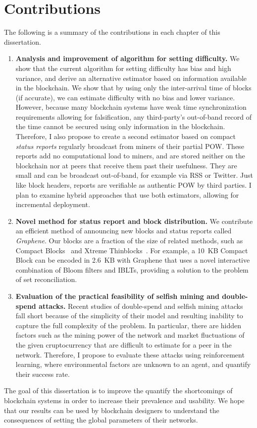 \section*{Contributions}
The following is a summary of the contributions in each chapter of this dissertation. 
\begin{enumerate}
\item \textbf{Analysis and improvement of algorithm for setting difficulty.} We show that the current algorithm for setting difficulty has bias and high variance, and derive an alternative estimator based on information available in the blockchain. We show that by using only the inter-arrival time of blocks (if accurate), we can estimate difficulty with no bias and lower variance. However, because many blockchain systems have weak time synchronization requirements allowing for falsification, any third-party's out-of-band record of the time cannot be secured using only information in the blockchain. Therefore, I also propose to create a second estimator based on compact {\em status reports} regularly broadcast from miners of their partial POW. These reports add no computational load to miners, and are stored neither on the blockchain nor at peers that receive them past their usefulness. They are small and can be broadcast out-of-band, for example via RSS or Twitter. Just like block headers, reports are verifiable as authentic POW by third parties. I plan to examine hybrid approaches that use both estimators, allowing for incremental deployment. 
\item \textbf{Novel method for status report and block distribution.} We contribute an efficient method of announcing new blocks and status reports called \textit{Graphene}. Our blocks are a fraction of the size of related methods, such as Compact Blocks~\cite{Corallo:2016} and Xtreme Thinblocks~\cite{Tschipper:2016}. For example, a 10~KB Compact Block can be encoded in 2.6~KB with Graphene that uses a novel interactive combination of Bloom filters\cite{Bloom:1970} and IBLTs\cite{goodrich:2011}, providing a solution to the problem of set reconciliation. 
\item \textbf{Evaluation of the practical feasibility of selfish mining and double-spend attacks.} Recent studies of double-spend and selfish mining attacks fall short because of the simplicity of their model and resulting inability to capture the full complexity of the problem. In particular, there are hidden factors such as the mining power of the network and market fluctuations of the given cruptocurrency that are difficult to estimate for a peer in the network. Therefore, I propose to evaluate these attacks using reinforcement learning, where environmental factors are unknown to an agent, and quantify their success rate. 
\end{enumerate}
The goal of this dissertation is to improve the quantify the shortcomings of blockchain systems in order to increase their prevalence and usability. We hope that our results can be used by blockchain designers to understand the consequences of setting the global parameters of their networks. 

